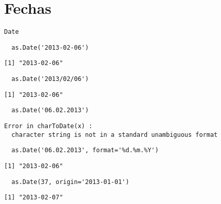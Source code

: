 \documentclass[xcolor={usenames,svgnames,dvipsnames}]{beamer}
\begin{document}
\section{Fechas}
\label{sec:org587eff4}
\begin{frame}[fragile,label={sec:orga0fa92c}]{\texttt{Date}}
 \lstset{language=r,label= ,caption= ,captionpos=b,numbers=none}
\begin{lstlisting}
  as.Date('2013-02-06')
\end{lstlisting}

\begin{verbatim}
[1] "2013-02-06"
\end{verbatim}

\lstset{language=r,label= ,caption= ,captionpos=b,numbers=none}
\begin{lstlisting}
  as.Date('2013/02/06')
\end{lstlisting}

\begin{verbatim}
[1] "2013-02-06"
\end{verbatim}

\lstset{language=r,label= ,caption= ,captionpos=b,numbers=none}
\begin{lstlisting}
  as.Date('06.02.2013')
\end{lstlisting}

\begin{verbatim}
Error in charToDate(x) : 
  character string is not in a standard unambiguous format
\end{verbatim}

\lstset{language=r,label= ,caption= ,captionpos=b,numbers=none}
\begin{lstlisting}
  as.Date('06.02.2013', format='%d.%m.%Y')
\end{lstlisting}

\begin{verbatim}
[1] "2013-02-06"
\end{verbatim}

\lstset{language=r,label= ,caption= ,captionpos=b,numbers=none}
\begin{lstlisting}
  as.Date(37, origin='2013-01-01')
\end{lstlisting}

\begin{verbatim}
[1] "2013-02-07"
\end{verbatim}
\end{frame}
\end{document}
